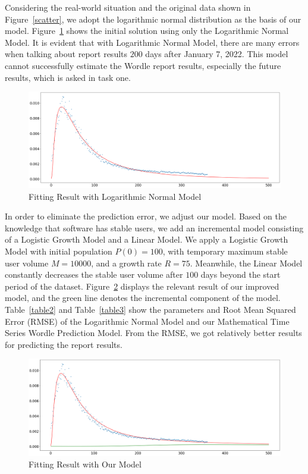 \documentclass[12pt]{article}
\begin{document}
\noindent
Considering the real-world situation and the original data shown in Figure~\ref{scatter}, we adopt the logarithmic normal distribution as the basis of our model. Figure~\ref{log-norm} shows the initial solution using only the Logarithmic Normal Model. It is evident that with Logarithmic Normal Model, there are many errors when talking about report results $200$ days after January 7, 2022. This model cannot successfully estimate the Wordle report results, especially the future results, which is asked in task one.

\begin{figure}[h]
    \centering
    \includegraphics[width=15.5cm]{figures/log-norm.png}
    \caption{Fitting Result with Logarithmic Normal Model}
    \label{log-norm}
\end{figure}

\noindent
In order to eliminate the prediction error, we adjust our model. Based on the knowledge that software has stable users, we add an incremental model consisting of a Logistic Growth Model and a Linear Model. We apply a Logistic Growth Model with initial population $P(0)=100$, with temporary maximum stable user volume $M=10000$, and a growth rate $R=75$. Meanwhile, the Linear Model constantly decreases the stable user volume after $100$ days beyond the start period of the dataset. Figure~\ref{model1Add} displays the relevant result of our improved model, and the green line denotes the incremental component of the model. Table~\ref{table2} and Table~\ref{table3} show the parameters and Root Mean Squared Error (RMSE) of the Logarithmic Normal Model and our Mathematical Time Series Wordle Prediction Model. From the RMSE, we got relatively better results for predicting the report results.

\begin{figure}[h]
    \centering
    \includegraphics[width=15.5cm]{figures/model1Add.png}
    \caption{Fitting Result with Our Model}
    \label{model1Add}
\end{figure}
\end{document}
